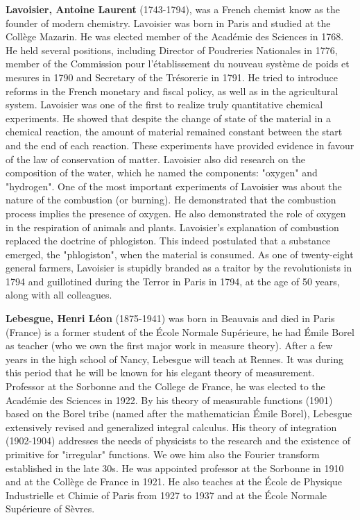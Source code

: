 \textbf{Lavoisier, Antoine Laurent} (1743-1794), was a French chemist know as the founder of modern chemistry. Lavoisier was born in Paris and studied at the Collège Mazarin. He was elected member of the Académie des Sciences in 1768. He held several positions, including Director of Poudreries Nationales in 1776, member of the Commission pour l'établissement du nouveau système de poids et mesures in 1790 and Secretary of the Trésorerie in 1791. He tried to introduce reforms in the French monetary and fiscal policy, as well as in the agricultural system. Lavoisier was one of the first to realize truly quantitative chemical experiments. He showed that despite the change of state of the material in a chemical reaction, the amount of material remained constant between the start and the end of each reaction. These experiments have provided evidence in favour of the law of conservation of matter. Lavoisier also did research on the composition of the water, which he named the components: "oxygen" and "hydrogen". One of the most important experiments of Lavoisier was about the nature of the combustion (or burning). He demonstrated that the combustion process implies the presence of oxygen. He also demonstrated the role of oxygen in the respiration of animals and plants. Lavoisier's explanation of combustion replaced the doctrine of phlogiston. This indeed postulated that a substance emerged, the "phlogiston", when the material is consumed. As one of twenty-eight general farmers, Lavoisier is stupidly branded as a traitor by the revolutionists in 1794 and guillotined during the Terror in Paris in 1794, at the age of 50 years, along with all colleagues.

\textbf{Lebesgue, Henri Léon} (1875-1941) was born in Beauvais and died in Paris (France) is a former student of the École Normale Supérieure, he had Émile Borel as teacher (who we own the first major work in measure theory). After a few years in the high school of Nancy, Lebesgue will teach at Rennes. It was during this period that he will be known for his elegant theory of measurement. Professor at the Sorbonne and the College de France, he was elected to the Académie des Sciences in 1922. By his theory of measurable functions (1901) based on the Borel tribe (named after the mathematician Émile Borel), Lebesgue extensively revised and generalized integral calculus. His theory of integration (1902-1904) addresses the needs of physicists to the research and the existence of primitive for "irregular" functions. We owe him also the Fourier transform established in the late 30s. He was appointed professor at the Sorbonne in 1910 and at the Collège de France in 1921. He also teaches at the École de Physique Industrielle et Chimie of Paris from 1927 to 1937 and at the École Normale Supérieure of Sèvres.

